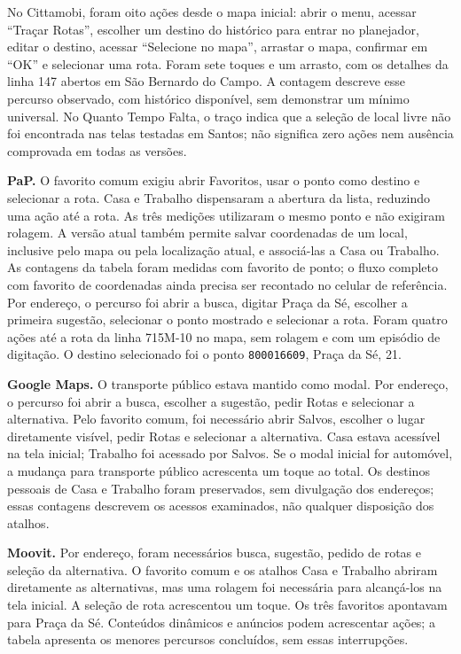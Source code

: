 No Cittamobi, foram oito ações desde o mapa inicial: abrir o menu, acessar ``Traçar Rotas'', escolher um destino do histórico para entrar no planejador, editar o destino, acessar ``Selecione no mapa'', arrastar o mapa, confirmar em ``OK'' e selecionar uma rota. Foram sete toques e um arrasto, com os detalhes da linha 147 abertos em São Bernardo do Campo. A contagem descreve esse percurso observado, com histórico disponível, sem demonstrar um mínimo universal. No Quanto Tempo Falta, o traço indica que a seleção de local livre não foi encontrada nas telas testadas em Santos; não significa zero ações nem ausência comprovada em todas as versões.

\textbf{PaP.} O favorito comum exigiu abrir Favoritos, usar o ponto como destino e selecionar a rota. Casa e Trabalho dispensaram a abertura da lista, reduzindo uma ação até a rota. As três medições utilizaram o mesmo ponto e não exigiram rolagem. A versão atual também permite salvar coordenadas de um local, inclusive pelo mapa ou pela localização atual, e associá-las a Casa ou Trabalho. As contagens da tabela foram medidas com favorito de ponto; o fluxo completo com favorito de coordenadas ainda precisa ser recontado no celular de referência. Por endereço, o percurso foi abrir a busca, digitar Praça da Sé, escolher a primeira sugestão, selecionar o ponto mostrado e selecionar a rota. Foram quatro ações até a rota da linha 715M-10 no mapa, sem rolagem e com um episódio de digitação. O destino selecionado foi o ponto \texttt{800016609}, Praça da Sé, 21.

\textbf{Google Maps.} O transporte público estava mantido como modal. Por endereço, o percurso foi abrir a busca, escolher a sugestão, pedir Rotas e selecionar a alternativa. Pelo favorito comum, foi necessário abrir Salvos, escolher o lugar diretamente visível, pedir Rotas e selecionar a alternativa. Casa estava acessível na tela inicial; Trabalho foi acessado por Salvos. Se o modal inicial for automóvel, a mudança para transporte público acrescenta um toque ao total. Os destinos pessoais de Casa e Trabalho foram preservados, sem divulgação dos endereços; essas contagens descrevem os acessos examinados, não qualquer disposição dos atalhos.

\textbf{Moovit.} Por endereço, foram necessários busca, sugestão, pedido de rotas e seleção da alternativa. O favorito comum e os atalhos Casa e Trabalho abriram diretamente as alternativas, mas uma rolagem foi necessária para alcançá-los na tela inicial. A seleção de rota acrescentou um toque. Os três favoritos apontavam para Praça da Sé. Conteúdos dinâmicos e anúncios podem acrescentar ações; a tabela apresenta os menores percursos concluídos, sem essas interrupções.

